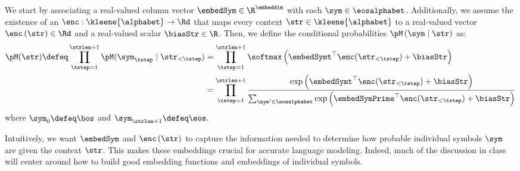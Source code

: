 We start by associating a real-valued column vector $\embedSym \in \R^\embeddim$ with each $\sym \in \eosalphabet$.
Additionally, we assume the existence of an  $\enc : \kleene{\alphabet} \rightarrow \Rd$ that maps every context $\str \in \kleene{\alphabet}$ to a real-valued vector $\enc\left(\str\right) \in \Rd$ and a real-valued scalar $\biasStr \in \R$. 
Then, we define the conditional probabilities $\pM\left(\sym\mid\str\right)$ as:
\begin{align} \label{eq:softmax}
\pM(\str) \defeq \prod_{\tstep=1}^{\strlen + 1} \pM(\sym_\tstep \mid \str_{<\tstep}) &= \prod_{\tstep=1}^{\strlen + 1} \softmax\left(\embedSymt^{\top} \enc(\str_{<\tstep}) + \biasStr\right) \\
&= \prod_{\tstep=1}^{\strlen + 1} \frac{\exp\left(\embedSymt^{\top} \enc(\str_{<\tstep}) + \biasStr \right) }{\sum_{\sym' \in \eosalphabet} \exp\left(\embedSymPrime^{\top} \enc(\str_{<\tstep}) + \biasStr\right)} 
\end{align}
where $\sym_0 \defeq \bos$ and $\sym_{\strlen + 1} \defeq \eos$.

Intuitively, we want $\embedSym$ and $\enc\left(\str\right)$ to capture the information needed to determine how probable individual symbols $\sym$ are given the context $\str$. 
This makes these embeddings crucial for accurate language modeling. 
Indeed, much of the discussion in class will center around how to build good embedding functions and embeddings of individual symbols. 
